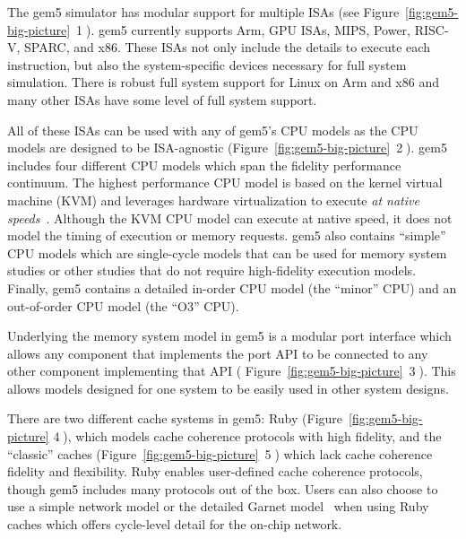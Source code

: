 The gem5 simulator has modular support for multiple ISAs (see Figure~\ref{fig:gem5-big-picture}~\textcircled{1}).
gem5 currently supports Arm, GPU ISAs, MIPS, Power, RISC-V, SPARC, and x86.
These ISAs not only include the details to execute each instruction, but also the system-specific devices necessary for full system simulation.
There is robust full system support for Linux on Arm and x86 and many other ISAs have some level of full system support.

All of these ISAs can be used with any of gem5's CPU models as the CPU models are designed to be ISA-agnostic (Figure~\ref{fig:gem5-big-picture}~\textcircled{2}).
gem5 includes four different CPU models which span the fidelity performance continuum.
The highest performance CPU model is based on the kernel virtual machine (KVM) and leverages hardware virtualization to execute \emph{at native speeds}~\cite{full-speed-ahead}.
Although the KVM CPU model can execute at native speed, it does not model the timing of execution or memory requests.
gem5 also contains ``simple'' CPU models which are single-cycle models that can be used for memory system studies or other studies that do not require high-fidelity execution models.
Finally, gem5 contains a detailed in-order CPU model (the ``minor'' CPU) and an out-of-order CPU model (the ``O3'' CPU).

Underlying the memory system model in gem5 is a modular port interface which allows any component that implements the port API to be connected to any other component implementing that API ( Figure~\ref{fig:gem5-big-picture}~\textcircled{3}).
This allows models designed for one system to be easily used in other system designs.

There are two different cache systems in gem5: Ruby (Figure~\ref{fig:gem5-big-picture} \textcircled{4}), which models cache coherence protocols with high fidelity, and the ``classic'' caches (Figure~\ref{fig:gem5-big-picture}~\textcircled{5}) which lack cache coherence fidelity and flexibility.
Ruby enables user-defined cache coherence protocols, though gem5 includes many protocols out of the box.
Users can also choose to use a simple network model or the detailed Garnet model~\cite{garnet-2} when using Ruby caches which offers cycle-level detail for the on-chip network.

